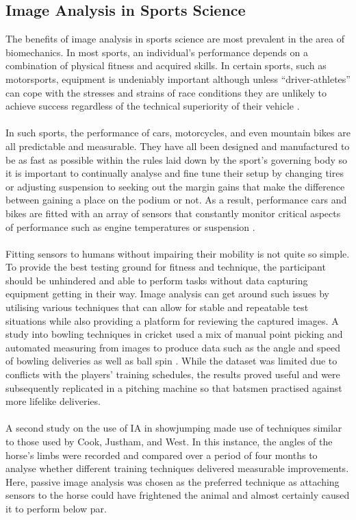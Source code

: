 \subsection{Image Analysis in Sports Science}
	The benefits of image analysis in sports science are most prevalent in the area of biomechanics. In most sports, an individual’s performance depends on a combination of physical fitness and acquired skills. In certain sports, such as motorsports, equipment is undeniably important although unless “driver-athletes” can cope with the stresses and strains of race conditions they are unlikely to achieve success regardless of the technical superiority of their vehicle \citep{klarica2001performance}.
	\\\\
	In such sports, the performance of cars, motorcycles, and even mountain bikes are all predictable and measurable. They have all been designed and manufactured to be as fast as possible within the rules laid down by the sport’s governing body so it is important to continually analyse and fine tune their setup by changing tires or adjusting suspension to seeking out the margin gains that make the difference between gaining a place on the podium or not. As a result, performance cars and bikes are fitted with an array of sensors that constantly monitor critical aspects of performance such as engine temperatures or suspension \citep{segers2008analysis}. 
	\\\\
	Fitting sensors to humans without impairing their mobility is not quite so simple. To provide the best testing ground for fitness and technique, the participant should be unhindered and able to perform tasks without data capturing equipment getting in their way. Image analysis can get around such issues by utilising various techniques that can allow for stable and repeatable test situations while also providing a platform for reviewing the captured images. A study into bowling techniques in cricket used a mix of manual point picking and automated measuring from images to produce data such as the angle and speed of bowling deliveries as well as ball spin \citep{cricketimaging}. While the dataset was limited due to conflicts with the players’ training schedules, the results proved useful and were subsequently replicated in a pitching machine so that batsmen practised against more lifelike deliveries.
	\\\\
	A second study on the use of IA in showjumping \citep{jumpyhorses} made use of techniques similar to those used by Cook, Justham, and West. In this instance, the angles of the horse’s limbs were recorded and compared over a period of four months to analyse whether different training techniques delivered measurable improvements. Here, passive image analysis was chosen as the preferred technique as attaching sensors to the horse could have frightened the animal and almost certainly caused it to perform below par.